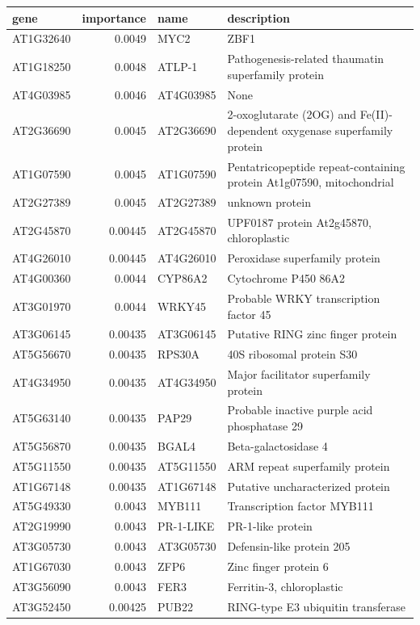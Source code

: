 \documentclass[11pt]{article}
\begin{document}
\begin{center}
\begin{tabular}{lrll}
gene & importance & name & description\\
\hline
AT1G32640 & 0.0049 & MYC2 & ZBF1\\
AT1G18250 & 0.0048 & ATLP-1 & Pathogenesis-related thaumatin superfamily protein\\
AT4G03985 & 0.0046 & AT4G03985 & None\\
AT2G36690 & 0.0045 & AT2G36690 & 2-oxoglutarate (2OG) and Fe(II)-dependent oxygenase superfamily protein\\
AT1G07590 & 0.0045 & AT1G07590 & Pentatricopeptide repeat-containing protein At1g07590, mitochondrial\\
AT2G27389 & 0.0045 & AT2G27389 & unknown protein\\
AT2G45870 & 0.00445 & AT2G45870 & UPF0187 protein At2g45870, chloroplastic\\
AT4G26010 & 0.00445 & AT4G26010 & Peroxidase superfamily protein\\
AT4G00360 & 0.0044 & CYP86A2 & Cytochrome P450 86A2\\
AT3G01970 & 0.0044 & WRKY45 & Probable WRKY transcription factor 45\\
AT3G06145 & 0.00435 & AT3G06145 & Putative RING zinc finger protein\\
AT5G56670 & 0.00435 & RPS30A & 40S ribosomal protein S30\\
AT4G34950 & 0.00435 & AT4G34950 & Major facilitator superfamily protein\\
AT5G63140 & 0.00435 & PAP29 & Probable inactive purple acid phosphatase 29\\
AT5G56870 & 0.00435 & BGAL4 & Beta-galactosidase 4\\
AT5G11550 & 0.00435 & AT5G11550 & ARM repeat superfamily protein\\
AT1G67148 & 0.00435 & AT1G67148 & Putative uncharacterized protein\\
AT5G49330 & 0.0043 & MYB111 & Transcription factor MYB111\\
AT2G19990 & 0.0043 & PR-1-LIKE & PR-1-like protein\\
AT3G05730 & 0.0043 & AT3G05730 & Defensin-like protein 205\\
AT1G67030 & 0.0043 & ZFP6 & Zinc finger protein 6\\
AT3G56090 & 0.0043 & FER3 & Ferritin-3, chloroplastic\\
AT3G52450 & 0.00425 & PUB22 & RING-type E3 ubiquitin transferase\\

\end{tabular}
\end{center}
\end{document}
